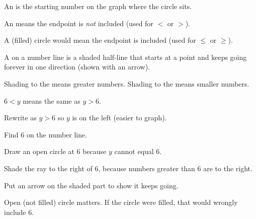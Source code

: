 \begin{words}
  \item An is the starting number on the graph where the circle
        sits.
  \item An means the endpoint is \textit{not} included (used
        for $<$ or $>$).
  \item A (filled) circle would mean the endpoint is included (used
        for $\le$ or $\ge$).
  \item A on a number line is a shaded half-line that starts at a point
        and keeps going forever in one direction (shown with an arrow).
  \item Shading to the means greater numbers. Shading to the
        means smaller numbers.
  \item $6 < y$ means the same as $y > 6$.
\end{words}

\begin{steps}
  \item Rewrite as $y > 6$ so $y$ is on the left (easier to graph).
  \item Find 6 on the number line.
  \item Draw an open circle at 6 because $y$ cannot equal 6.
  \item Shade the ray to the right of 6, because numbers greater than 6 are to
        the right.
  \item Put an arrow on the shaded part to show it keeps going.
        \begin{center}
        \end{center}
\end{steps}


Open (not filled) circle matters. If the circle were filled, that would wrongly
include 6.

